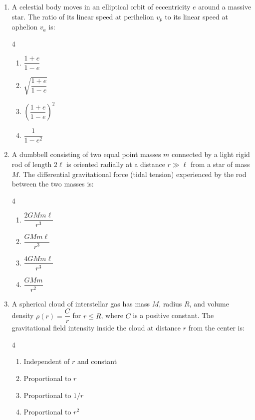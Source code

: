 \documentclass[11pt,a4paper]{article}
\begin{document}
\begin{enumerate}[label=\textbf{\arabic*.},leftmargin=18pt,itemsep=10pt]
  \item A celestial body moves in an elliptical orbit of eccentricity $e$ around a massive star. The ratio of its linear speed at perihelion $v_p$ to its linear speed at aphelion $v_a$ is:
  \begin{multicols}{4}
    \begin{enumerate}[label=(\Alph*)]
      \item $\dfrac{1+e}{1-e}$
      \item $\sqrt{\dfrac{1+e}{1-e}}$
      \item $\left(\dfrac{1+e}{1-e}\right)^2$
      \item $\dfrac{1}{1-e^2}$
    \end{enumerate}
  \end{multicols}

  \item A dumbbell consisting of two equal point masses $m$ connected by a light rigid rod of length $2\ell$ is oriented radially at a distance $r \gg \ell$ from a star of mass $M$. The differential gravitational force (tidal tension) experienced by the rod between the two masses is:
  \begin{multicols}{4}
    \begin{enumerate}[label=(\Alph*)]
      \item $\dfrac{2GMm\ell}{r^3}$
      \item $\dfrac{GMm\ell}{r^3}$
      \item $\dfrac{4GMm\ell}{r^3}$
      \item $\dfrac{GMm}{r^2}$
    \end{enumerate}
  \end{multicols}

  \item A spherical cloud of interstellar gas has mass $M$, radius $R$, and volume density $\rho(r) = \dfrac{C}{r}$ for $r \le R$, where $C$ is a positive constant. The gravitational field intensity inside the cloud at distance $r$ from the center is:
  \begin{multicols}{4}
    \begin{enumerate}[label=(\Alph*)]
      \item Independent of $r$ and constant
      \item Proportional to $r$
      \item Proportional to $1/r$
      \item Proportional to $r^2$
    \end{enumerate}
  \end{multicols}


\end{enumerate}
\end{document}

